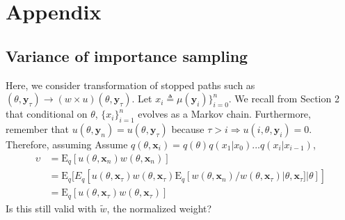 \documentclass{article}
\begin{document}


\section{Appendix}
\subsection{Variance of importance sampling}

Here, we consider transformation of stopped paths such as
$(\theta,\mathbf{y}_\tau)\rightarrow (w \times u)
(\theta,\mathbf{y}_{\tau})$. Let $x_i \triangleq
\mu(\mathbf{y}_i)\}_{i=0}^{n}$. We recall from Section 2 that
conditional on $\theta$, $\{x_i\}_{i=1}^{n}$ evolves as a Markov
chain. Furthermore, remember that
$u(\theta,\mathbf{y}_{n})=u(\theta,\mathbf{y}_{\tau})$ because
$\tau>i\Rightarrow u(i,\theta,\mathbf{y}_{i})=0$. Therefore,
assuming Assume
$q(\theta,\mathbf{x}_i)=q(\theta)q(x_1|x_0)...q(x_{i}|x_{i-1})$,
\begin{align}
\upsilon&=\mathrm{E}_q[u(\theta,\mathbf{x}_{n})w(\theta,\mathbf{x}_{n})]\\
&=\mathrm{E}_q[E_q[u(\theta,\mathbf{x}_{\tau})w(\theta,\mathbf{x}_{\tau})\mathrm{E}_q[w(\theta,\mathbf{x}_{n})/w(\theta,\mathbf{x}_{\tau})|\theta,\mathbf{x}_{\tau}]|\theta]]\\
&=\mathrm{E}_q[u(\theta,\mathbf{x}_{\tau})w(\theta,\mathbf{x}_{\tau})]
\end{align}Is this still valid with $\tilde w$, the normalized
weight?
\end{document}
